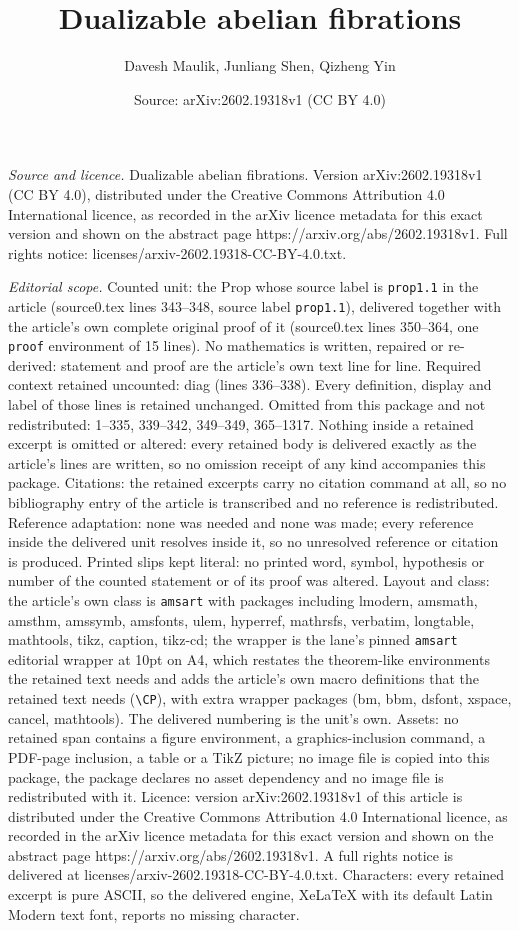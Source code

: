 \documentclass[10pt,a4paper]{amsart}
\title[Dualizable abelian fibrations]{Dualizable abelian fibrations}
\author{Davesh Maulik, Junliang Shen, Qizheng Yin}
\date{Source: arXiv:2602.19318v1 (CC BY 4.0)}
\begin{document}
\maketitle

\noindent\emph{Source and licence.} Dualizable abelian fibrations. Version arXiv:2602.19318v1 (CC BY 4.0), distributed under the Creative Commons Attribution 4.0 International licence, as recorded in the arXiv licence metadata for this exact version and shown on the abstract page https://arxiv.org/abs/2602.19318v1. Full rights notice: licenses/arxiv-2602.19318-CC-BY-4.0.txt.\par\smallskip

\noindent\textit{Editorial scope.} Counted unit: the Prop whose source label is \texttt{prop1.1} in the article (source0.tex lines 343--348, source label \texttt{prop1.1}), delivered together with the article's own complete original proof of it (source0.tex lines 350--364, one \texttt{proof} environment of 15 lines). No mathematics is written, repaired or re-derived: statement and proof are the article's own text line for line. Required context retained uncounted: diag (lines 336--338). Every definition, display and label of those lines is retained unchanged. Omitted from this package and not redistributed: 1--335, 339--342, 349--349, 365--1317. Nothing inside a retained excerpt is omitted or altered: every retained body is delivered exactly as the article's lines are written, so no omission receipt of any kind accompanies this package. Citations: the retained excerpts carry no citation command at all, so no bibliography entry of the article is transcribed and no reference is redistributed. Reference adaptation: none was needed and none was made; every reference inside the delivered unit resolves inside it, so no unresolved reference or citation is produced. Printed slips kept literal: no printed word, symbol, hypothesis or number of the counted statement or of its proof was altered. Layout and class: the article's own class is \texttt{amsart} with packages including lmodern, amsmath, amsthm, amssymb, amsfonts, ulem, hyperref, mathrsfs, verbatim, longtable, mathtools, tikz, caption, tikz-cd; the wrapper is the lane's pinned \texttt{amsart} editorial wrapper at 10pt on A4, which restates the theorem-like environments the retained text needs and adds the article's own macro definitions that the retained text needs (\texttt{\textbackslash CP}), with extra wrapper packages (bm, bbm, dsfont, xspace, cancel, mathtools). The delivered numbering is the unit's own. Assets: no retained span contains a figure environment, a graphics-inclusion command, a PDF-page inclusion, a table or a TikZ picture; no image file is copied into this package, the package declares no asset dependency and no image file is redistributed with it. Licence: version arXiv:2602.19318v1 of this article is distributed under the Creative Commons Attribution 4.0 International licence, as recorded in the arXiv licence metadata for this exact version and shown on the abstract page https://arxiv.org/abs/2602.19318v1. A full rights notice is delivered at licenses/arxiv-2602.19318-CC-BY-4.0.txt. Characters: every retained excerpt is pure ASCII, so the delivered engine, XeLaTeX with its default Latin Modern text font, reports no missing character.
\end{document}
